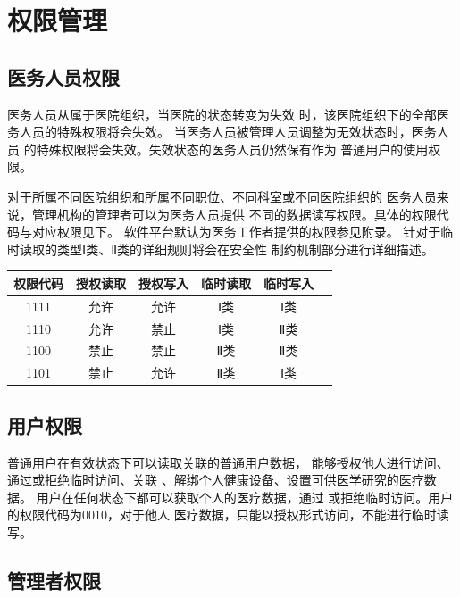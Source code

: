 \documentclass[UTF8]{ctexart}
\begin{document}
    \section{权限管理}
    \subsection{医务人员权限}
    \par
    医务人员从属于医院组织，当医院的状态转变为失效
    时，该医院组织下的全部医务人员的特殊权限将会失效。
    当医务人员被管理人员调整为无效状态时，医务人员
    的特殊权限将会失效。失效状态的医务人员仍然保有作为
    普通用户的使用权限。
    \par
    对于所属不同医院组织和所属不同职位、不同科室或不同医院组织的
    医务人员来说，管理机构的管理者可以为医务人员提供
    不同的数据读写权限。具体的权限代码与对应权限见下。
    软件平台默认为医务工作者提供的权限参见附录。
    针对于临时读取的类型Ⅰ类、Ⅱ类的详细规则将会在安全性
    制约机制部分进行详细描述。
    \begin{center}
    \begin{tabular}{cccccc}
        \hline
        权限代码& 授权读取& 授权写入& 临时读取& 临时写入\\
        \hline
        1111& 允许& 允许& Ⅰ类& Ⅰ类\\
        1110& 允许& 禁止& Ⅰ类& Ⅱ类\\
        1100& 禁止& 禁止& Ⅱ类& Ⅱ类\\
        1101& 禁止& 允许& Ⅱ类& Ⅰ类\\
        \hline
    \end{tabular}
    \end{center}
    \subsection{用户权限}
    \par
    普通用户在有效状态下可以读取关联的普通用户数据，
    能够授权他人进行访问、通过或拒绝临时访问、关联
    、解绑个人健康设备、设置可供医学研究的医疗数据。
    用户在任何状态下都可以获取个人的医疗数据，通过
    或拒绝临时访问。用户的权限代码为0010，对于他人
    医疗数据，只能以授权形式访问，不能进行临时读写。
    \subsection{管理者权限}
\end{document}
